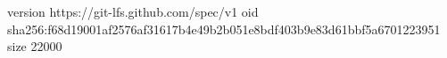 version https://git-lfs.github.com/spec/v1
oid sha256:f68d19001af2576af31617b4e49b2b051e8bdf403b9e83d61bbf5a6701223951
size 22000
